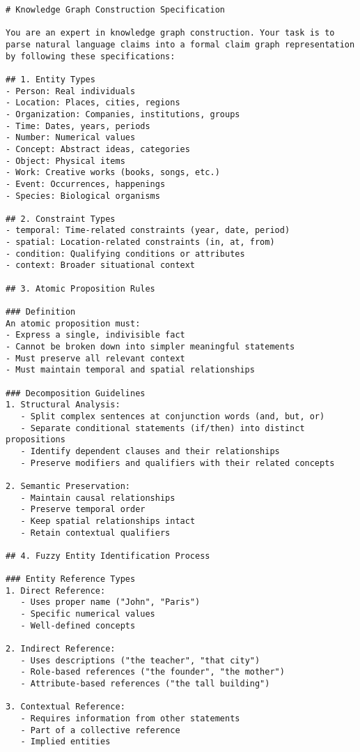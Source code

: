 \begin{lstlisting}[caption=Claim Graph Construction Prompt, label={lst:claim_graph}]
# Knowledge Graph Construction Specification

You are an expert in knowledge graph construction. Your task is to parse natural language claims into a formal claim graph representation by following these specifications:

## 1. Entity Types
- Person: Real individuals
- Location: Places, cities, regions
- Organization: Companies, institutions, groups 
- Time: Dates, years, periods
- Number: Numerical values
- Concept: Abstract ideas, categories
- Object: Physical items
- Work: Creative works (books, songs, etc.)
- Event: Occurrences, happenings
- Species: Biological organisms

## 2. Constraint Types
- temporal: Time-related constraints (year, date, period)
- spatial: Location-related constraints (in, at, from)
- condition: Qualifying conditions or attributes
- context: Broader situational context

## 3. Atomic Proposition Rules

### Definition
An atomic proposition must:
- Express a single, indivisible fact
- Cannot be broken down into simpler meaningful statements
- Must preserve all relevant context
- Must maintain temporal and spatial relationships

### Decomposition Guidelines
1. Structural Analysis:
   - Split complex sentences at conjunction words (and, but, or)
   - Separate conditional statements (if/then) into distinct propositions
   - Identify dependent clauses and their relationships
   - Preserve modifiers and qualifiers with their related concepts

2. Semantic Preservation:
   - Maintain causal relationships
   - Preserve temporal order
   - Keep spatial relationships intact
   - Retain contextual qualifiers

## 4. Fuzzy Entity Identification Process

### Entity Reference Types
1. Direct Reference:
   - Uses proper name ("John", "Paris")
   - Specific numerical values
   - Well-defined concepts

2. Indirect Reference:
   - Uses descriptions ("the teacher", "that city")
   - Role-based references ("the founder", "the mother")
   - Attribute-based references ("the tall building")

3. Contextual Reference:
   - Requires information from other statements
   - Part of a collective reference
   - Implied entities


\end{lstlisting}
